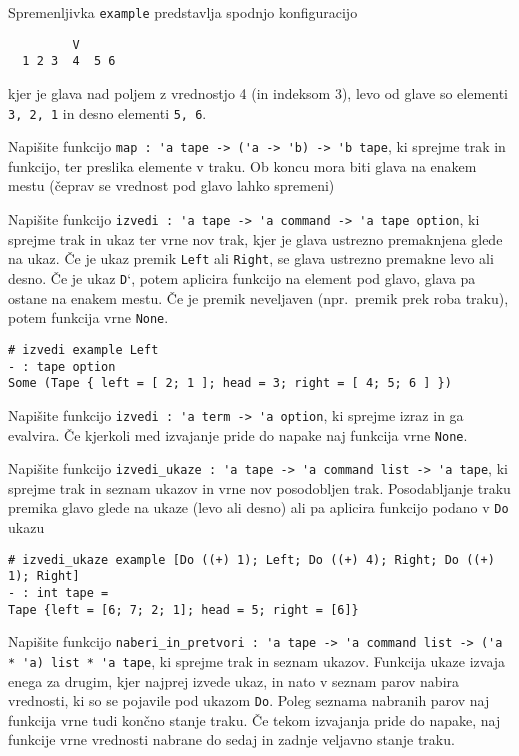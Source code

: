 \documentclass[arhiv]{../izpit}
\begin{document}
Spremenljivka \verb|example| predstavlja spodnjo konfiguracijo

\begin{verbatim}
         V
  1 2 3  4  5 6
\end{verbatim}

kjer je glava nad poljem z vrednostjo 4 (in indeksom 3), levo od glave so elementi \verb|3, 2, 1| in desno elementi \verb|5, 6|.


\podnaloga
Napišite funkcijo \verb|map : 'a tape -> ('a -> 'b) -> 'b tape|, ki sprejme trak in funkcijo, ter preslika elemente v traku. Ob koncu mora biti glava na enakem mestu (čeprav se vrednost pod glavo lahko spremeni)

\podnaloga
Napišite funkcijo \verb|izvedi : 'a tape -> 'a command -> 'a tape option|, ki sprejme trak in ukaz ter vrne nov trak, kjer je glava ustrezno premaknjena glede na ukaz.
Če je ukaz premik \verb|Left| ali \verb|Right|, se glava ustrezno premakne levo ali desno.
Če je ukaz \verb|D|`, potem aplicira funkcijo na element pod glavo, glava pa ostane na enakem mestu. Če je premik neveljaven (npr.~premik prek roba traku), potem funkcija vrne \verb|None|.

\begin{verbatim}
# izvedi example Left
- : tape option
Some (Tape { left = [ 2; 1 ]; head = 3; right = [ 4; 5; 6 ] })
\end{verbatim}

\podnaloga
Napišite funkcijo \verb|izvedi : 'a term -> 'a option|, ki sprejme izraz in ga evalvira. 
Če kjerkoli med izvajanje pride do napake naj funkcija vrne \verb|None|.

\podnaloga
Napišite funkcijo \verb|izvedi_ukaze : 'a tape -> 'a command list -> 'a tape|, ki sprejme trak in seznam ukazov in vrne nov posodobljen trak. Posodabljanje traku premika glavo glede na ukaze (levo ali desno) ali pa aplicira funkcijo podano v \verb|Do| ukazu

\begin{verbatim}
# izvedi_ukaze example [Do ((+) 1); Left; Do ((+) 4); Right; Do ((+) 1); Right]
- : int tape =
Tape {left = [6; 7; 2; 1]; head = 5; right = [6]}
\end{verbatim}

\podnaloga
Napišite funkcijo \verb|naberi_in_pretvori : 'a tape -> 'a command list -> ('a * 'a) list * 'a tape|, ki sprejme trak in seznam ukazov. 
Funkcija ukaze izvaja enega za drugim, kjer najprej izvede ukaz, in nato v seznam parov nabira vrednosti, ki so se pojavile pod ukazom \verb|Do|.
Poleg seznama nabranih parov naj funkcija vrne tudi končno stanje traku.
Če tekom izvajanja pride do napake, naj funkcije vrne vrednosti nabrane do sedaj in zadnje veljavno stanje traku. 
\end{document}
